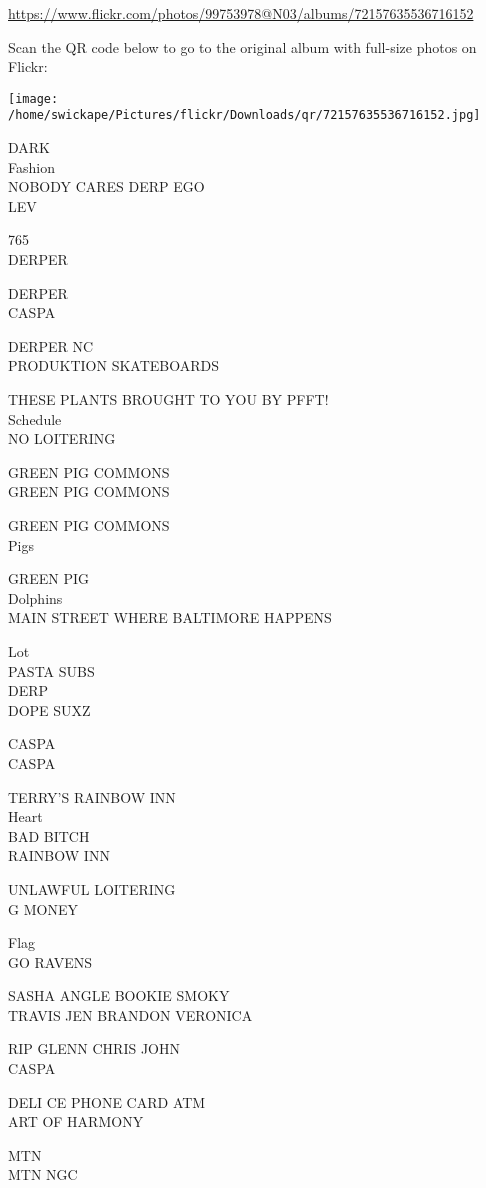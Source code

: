 \documentclass[10pt,letterpaper]{article}
\begin{document}
\url{https://www.flickr.com/photos/99753978@N03/albums/72157635536716152}

Scan the QR code below to go to the original album with full-size photos on Flickr:

\texttt{[image: /home/swickape/Pictures/flickr/Downloads/qr/72157635536716152.jpg]}


DARK\\
Fashion\\
NOBODY CARES DERP EGO\\
LEV

765\\
DERPER

DERPER\\
CASPA

DERPER NC\\
PRODUKTION SKATEBOARDS

THESE PLANTS BROUGHT TO YOU BY PFFT!\\
Schedule\\
NO LOITERING

GREEN PIG COMMONS\\
GREEN PIG COMMONS

GREEN PIG COMMONS\\
Pigs

GREEN PIG\\
Dolphins\\
MAIN STREET WHERE BALTIMORE HAPPENS

Lot\\
PASTA SUBS\\
DERP\\
DOPE SUXZ

CASPA\\
CASPA

TERRY'S RAINBOW INN\\
Heart\\
BAD BITCH\\
RAINBOW INN

UNLAWFUL LOITERING\\
G MONEY

Flag\\
GO RAVENS

SASHA ANGLE BOOKIE SMOKY\\
TRAVIS JEN BRANDON VERONICA

RIP GLENN CHRIS JOHN\\
CASPA

DELI CE PHONE CARD ATM\\
ART OF HARMONY

MTN\\
MTN NGC
\end{document}
